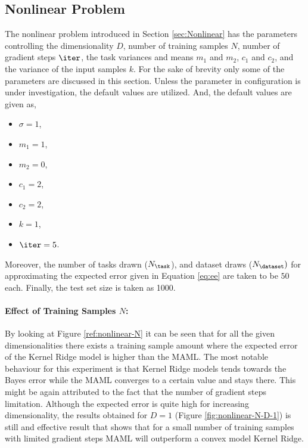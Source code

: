 \subsection{Nonlinear Problem}

The nonlinear problem introduced in Section \ref{sec:Nonlinear} has the parameters controlling the dimensionality $D$, number of training samples $N$, number of gradient steps $\iter$, the task variances and means $m_1$ and $m_2$, $c_1$ and $c_2$, and the variance of the input samples $k$. For the sake of brevity only some of the parameters are discussed in this section. Unless the parameter in configuration is under investigation, the default values are utilized. And, the default values are given as,
\begin{itemize}
  \item $\sigma=1$,
  \item $m_1=1$,
  \item $m_2=0$,
  \item $c_1=2$,
  \item $c_2=2$,
  \item $k=1$,
  \item $\iter=5$.
\end{itemize}
Moreover, the number of tasks drawn ($N_{\task}$), and dataset draws ($N_{\dataset})$  for approximating the expected error given in Equation \ref{eq:ee} are taken to be $50$ each. Finally, the test set size is taken as 1000.

\paragraph{Effect of Training Samples $N$:} By looking at Figure \ref{ref:nonlinear-N} it can be seen that for all the given dimensionalities there exists a training sample amount where the expected error of the Kernel Ridge model is higher than the MAML. The most notable behaviour for this experiment is that Kernel Ridge models tends towards the Bayes error while the MAML converges to a certain value and stays there. This might be again attributed to the fact that the number of gradient steps limitation. Although the expected error is quite high for increasing dimensionality, the results obtained for $D=1$ (Figure \ref{fig:nonlinear-N-D-1}) is still and effective result that shows that for a small number of training samples with limited gradient steps MAML will outperform a convex model Kernel Ridge.

